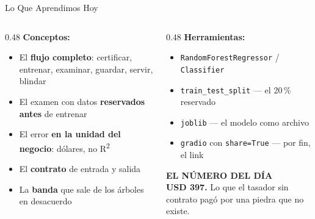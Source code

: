 \documentclass[aspectratio=169, 11pt]{beamer}
\begin{document}
\begin{frame}[shrink=8]{Lo Que Aprendimos Hoy}
  \vspace{-2pt}
  \begin{columns}[T]
    \begin{column}{0.48\textwidth}
      {\small\color{arcaDark}\bfseries\faLightbulb[regular]\hspace{5pt}Conceptos:}
      \vspace{4pt}
      {\footnotesize\color{textMuted}
      \begin{itemize}\setlength{\itemsep}{3pt}
        \item[{\color{codeGreen}\scriptsize\faCheck}]
          El \textbf{flujo completo}: certificar, entrenar, examinar,
          guardar, servir, blindar
        \item[{\color{codeGreen}\scriptsize\faCheck}]
          El examen con datos \textbf{reservados antes} de entrenar
        \item[{\color{codeGreen}\scriptsize\faCheck}]
          El error \textbf{en la unidad del negocio}: dólares, no
          R\textsuperscript{2}
        \item[{\color{codeGreen}\scriptsize\faCheck}]
          El \textbf{contrato} de entrada y salida
        \item[{\color{codeGreen}\scriptsize\faCheck}]
          La \textbf{banda} que sale de los árboles en desacuerdo
      \end{itemize}}
    \end{column}
    \begin{column}{0.48\textwidth}
      {\small\color{arcaDark}\bfseries\faTools\hspace{5pt}Herramientas:}
      \vspace{4pt}
      {\footnotesize\color{textMuted}
      \begin{itemize}\setlength{\itemsep}{3pt}
        \item[{\color{arcaRed}\scriptsize\faArrowRight}]
          \texttt{RandomForestRegressor} / \texttt{Classifier}
        \item[{\color{arcaRed}\scriptsize\faArrowRight}]
          \texttt{train\_test\_split} --- el 20\,\% reservado
        \item[{\color{arcaRed}\scriptsize\faArrowRight}]
          \texttt{joblib} --- el modelo como archivo
        \item[{\color{arcaRed}\scriptsize\faArrowRight}]
          \texttt{gradio} con \texttt{share=True} --- por fin, el link
      \end{itemize}}
      \vspace{5pt}
      \begin{tcolorbox}[colback=arcaGray, colframe=arcaRed, boxrule=0pt, leftrule=3pt,
        arc=3pt, left=6pt, right=6pt, top=4pt, bottom=4pt]
        {\scriptsize\color{arcaRed}\bfseries EL NÚMERO DEL DÍA}\\[3pt]
        {\scriptsize\color{textMuted}
         \textbf{USD 397.} Lo que el tasador sin contrato pagó por una
         piedra que no existe.}
      \end{tcolorbox}
    \end{column}
  \end{columns}
\end{frame}
\end{document}

